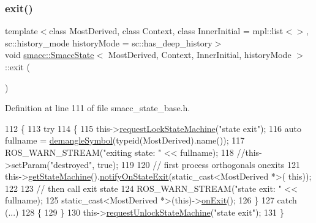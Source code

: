 \subsubsection{\texorpdfstring{exit()}{exit()}}
{\footnotesize\ttfamily template$<$class Most\+Derived, class Context, class Inner\+Initial = mpl\+::list$<$$>$, sc\+::history\+\_\+mode history\+Mode = sc\+::has\+\_\+deep\+\_\+history$>$ \\
void \hyperlink{classsmacc_1_1SmaccState}{smacc\+::\+Smacc\+State}$<$ Most\+Derived, Context, Inner\+Initial, history\+Mode $>$\+::exit (\begin{DoxyParamCaption}{ }\end{DoxyParamCaption})\hspace{0.3cm}{\ttfamily [inline]}}



Definition at line 111 of file smacc\+\_\+state\+\_\+base.\+h.


\begin{DoxyCode}
112   \{
113     \textcolor{keywordflow}{try}
114     \{
115       this->\hyperlink{classsmacc_1_1ISmaccState_ae733140761345e027713bd622d93bf0f}{requestLockStateMachine}(\textcolor{stringliteral}{"state exit"});
116       \textcolor{keyword}{auto} fullname = \hyperlink{namespacesmacc_1_1introspection_a2f495108db3e57604d8d3ff5ef030302}{demangleSymbol}(\textcolor{keyword}{typeid}(MostDerived).name());
117       ROS\_WARN\_STREAM(\textcolor{stringliteral}{"exiting state: "} << fullname);
118       \textcolor{comment}{//this->setParam("destroyed", true);}
119 
120       \textcolor{comment}{// first process orthogonals onexits}
121       this->\hyperlink{classsmacc_1_1SmaccState_afc39f8e0ca4001b2159a100da2fccd0e}{getStateMachine}().\hyperlink{classsmacc_1_1ISmaccStateMachine_a9d2bd4aca0c80a1ec22c5f95e7c38db8}{notifyOnStateExit}(static\_cast<MostDerived *>(\textcolor{keyword}{
      this}));
122 
123       \textcolor{comment}{// then call exit state}
124       ROS\_WARN\_STREAM(\textcolor{stringliteral}{"state exit: "} << fullname);
125       \textcolor{keyword}{static\_cast<}MostDerived *\textcolor{keyword}{>}(\textcolor{keyword}{this})->\hyperlink{classsmacc_1_1SmaccState_a82ca7c69153e86dc5eedf3f909560f3a}{onExit}();
126     \}
127     \textcolor{keywordflow}{catch} (...)
128     \{
129     \}
130     this->\hyperlink{classsmacc_1_1ISmaccState_a3bf006f25d5b9c0534c8e89ae2e93d40}{requestUnlockStateMachine}(\textcolor{stringliteral}{"state exit"});
131   \}
\end{DoxyCode}
\mbox{\label{classsmacc_1_1SmaccState_a897dbdfe52a8b944d4bf1844ddcc3aa5}} 
